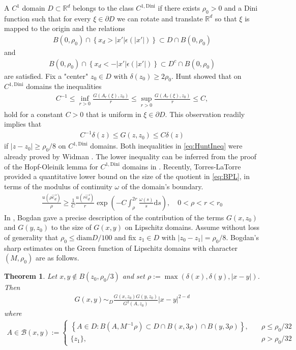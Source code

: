\documentclass[a4paper,12pt]{article}
\newtheorem{theorem}{Theorem}[section]
\theoremstyle{definition}
\theoremstyle{definition}
\begin{document}
	A $C^1$ domain $D\subset\mathbb R^d$ belongs to the class $C^{1,\mathrm{Dini}}$ if there exists $\rho_0>0$ and a Dini function such that for every $\xi\in\partial D$ we can rotate and translate $\mathbb{R}^d$ so that $\xi$ is mapped to the origin and the relations
	\begin{align}\label{eq:IntDiniCond}
		B(0,\rho_0)\cap\left\lbrace x_d>|x'|\epsilon(|x'|)\right\rbrace\subset D\cap B(0,\rho_0)
	\end{align}
	and
	\begin{align}\label{eq:ExtDiniCond}
		B(0,\rho_0)\cap\left\lbrace x_d<-|x'|\epsilon(|x'|)\right\rbrace\subset D^c\cap B(0,\rho_0)
	\end{align}
	are satisfied. Fix a "center" $z_0\in D$ with $\delta(z_0)\geq2\rho_0$. Hunt \cite{Hunt78} showed that on $C^{1,\mathrm{Dini}}$ domains the inequalities
	\begin{align}\label{eq:HuntIneq}
		C^{-1}\leq\inf_{r>0}\frac{G(A_r(\xi),z_0)}{r}\leq \sup_{r>0}\frac{G(A_r(\xi),z_0)}{r}\leq C,
	\end{align}
	hold for a constant $C>0$ that is uniform in $\xi\in\partial D$. This observation readily implies that 
	\begin{align}\label{eq:GreenIneqOnLDDomains}
		C^{-1}\delta(z)\leq G(z,z_0)\leq C\delta(z)
	\end{align}
	if $|z-z_0|\geq\rho_0/8$ on $C^{1,\mathrm{Dini}}$ domains. Both inequalities in \eqref{eq:HuntIneq} were already proved by Widman \cite{Widmann67}. The lower inequality can be inferred from the proof of the Hopf-Oleinik lemma for $C^{1,\mathrm{Dini}}$ domains in \cite{Widmann67}. Recently, Torres-LaTorre \cite[Theorem 1.1]{Clara26} provided a quantitative lower bound on the size of the quotient in \eqref{eq:BPL}, in terms of the modulus of continuity $\omega$ of the domain's boundary.
	\begin{align*}
		\frac{u(\rho \vec{e_d})}{\rho}\geq \frac{1}{C} \frac{u(r\vec{e_d})}{r}\exp\left(-C\int_\rho^{2r}\frac{\omega(s)}{s}\mathrm ds\right),\quad 0<\rho<r<r_0
	\end{align*}
	In \cite{Bogdan2000}, Bogdan gave a precise description of the contribution of the terms $G(x,z_0)$ and $G(y,z_0)$ to the size of $G(x,y)$ on Lipschitz domains. Assume without loss of generality that $\rho_0\leq \text{diam} D/100$ and fix $z_1\in D$ with $|z_0-z_1|=\rho_0/8$. Bogdan's sharp estimates on the Green function of Lipschitz domains with character $(M,\rho_0)$ are as follows.
	\begin{theorem}\label{thm:Bogdan}
		Let $x,y\notin B(z_0,\rho_0/3)$ and set $\rho:=\max(\delta(x),\delta(y),|x-y|)$. Then
		\begin{align*}%
			G(x,y)\sim_D\frac{G(x,z_0)G(y,z_0)}{G^2(A,z_0)}|x-y|^{2-d}
		\end{align*}
		where
		\begin{align*}
			A\in\mathscr{B}(x,y):=
			\begin{cases}
				\left\lbrace A\in D:B(A,M^{-1}\rho)\subset D\cap B(x,3\rho)\cap B(y,3\rho)\right\rbrace,\quad&\rho\leq \rho_0/32\\
				\lbrace z_1\rbrace,\quad&\rho>\rho_0/32
			\end{cases}
		\end{align*}
	\end{theorem}
\end{document}
